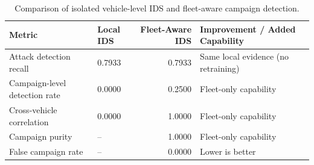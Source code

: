 \begin{table}[t]
\centering
\begin{tabular}{llrl}
\toprule
Metric & Local IDS & Fleet-Aware IDS & Improvement / Added Capability \\
\midrule
Attack detection recall & 0.7933 & 0.7933 & Same local evidence (no retraining) \\
Campaign-level detection rate & 0.0000 & 0.2500 & Fleet-only capability \\
Cross-vehicle correlation & 0.0000 & 1.0000 & Fleet-only capability \\
Campaign purity & -- & 1.0000 & Fleet-only capability \\
False campaign rate & -- & 0.0000 & Lower is better \\
\bottomrule
\end{tabular}
\caption{Comparison of isolated vehicle-level IDS and fleet-aware campaign detection.}
\label{tab:local-vs-fleet-campaign}
\end{table}

